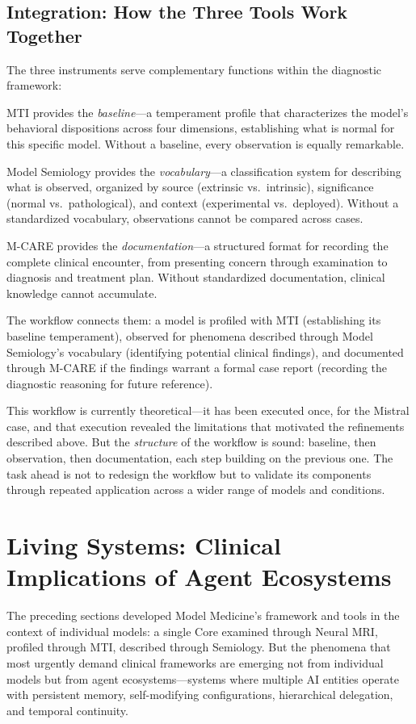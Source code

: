\documentclass[11pt]{article}
\begin{document}
\subsection{Integration: How the Three Tools Work Together}

The three instruments serve complementary functions within the diagnostic framework:

MTI provides the \emph{baseline}---a temperament profile that characterizes the model's behavioral dispositions across four dimensions, establishing what is normal for this specific model. Without a baseline, every observation is equally remarkable.

Model Semiology provides the \emph{vocabulary}---a classification system for describing what is observed, organized by source (extrinsic vs.\ intrinsic), significance (normal vs.\ pathological), and context (experimental vs.\ deployed). Without a standardized vocabulary, observations cannot be compared across cases.

M-CARE provides the \emph{documentation}---a structured format for recording the complete clinical encounter, from presenting concern through examination to diagnosis and treatment plan. Without standardized documentation, clinical knowledge cannot accumulate.

The workflow connects them: a model is profiled with MTI (establishing its baseline temperament), observed for phenomena described through Model Semiology's vocabulary (identifying potential clinical findings), and documented through M-CARE if the findings warrant a formal case report (recording the diagnostic reasoning for future reference).

This workflow is currently theoretical---it has been executed once, for the Mistral case, and that execution revealed the limitations that motivated the refinements described above. But the \emph{structure} of the workflow is sound: baseline, then observation, then documentation, each step building on the previous one. The task ahead is not to redesign the workflow but to validate its components through repeated application across a wider range of models and conditions.

\section{Living Systems: Clinical Implications of Agent Ecosystems}

The preceding sections developed Model Medicine's framework and tools in the context of individual models: a single Core examined through Neural MRI, profiled through MTI, described through Semiology. But the phenomena that most urgently demand clinical frameworks are emerging not from individual models but from agent ecosystems---systems where multiple AI entities operate with persistent memory, self-modifying configurations, hierarchical delegation, and temporal continuity.
\end{document}
